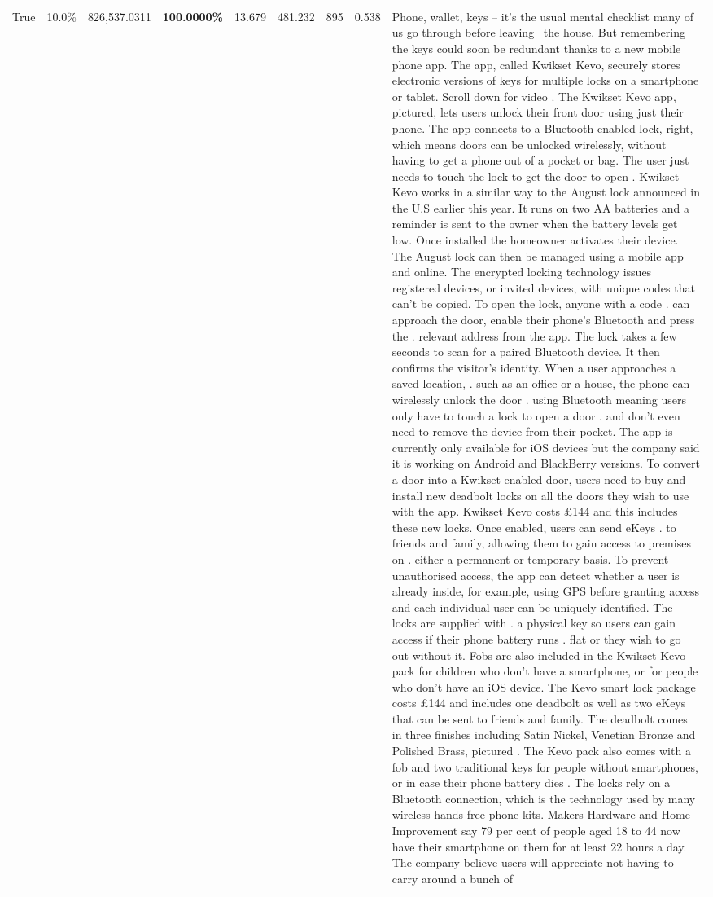 \begin{table}[H]
\begin{tabular}{lllrlllll}
True & 10.0\% & 826,537.0311 & \bfseries \color{red} 100.0000\% & 13.679 & 481.232 & 895 & 0.538 & Phone, wallet, keys – it’s the usual mental checklist many of us go through before leaving  the house. But remembering the keys could soon be redundant thanks to a new mobile phone app. The app, called Kwikset Kevo, securely stores electronic versions of keys for multiple locks on a smartphone or tablet. Scroll down for video . The Kwikset Kevo app, pictured, lets users unlock their front door using just their phone. The app connects to a Bluetooth enabled lock, right, which means doors can be unlocked wirelessly, without having to get a phone out of a pocket or bag. The user just needs to touch the lock to get the door to open . Kwikset Kevo works in a similar way to the August lock announced in the U.S earlier this year. It runs on two AA batteries and a reminder is sent to the owner when the battery levels get low. Once installed the homeowner activates their device. The August lock can then be managed using a mobile app and online. The encrypted locking technology issues registered devices, or invited devices, with unique codes that can't be copied. To open the lock, anyone with a code . can approach the door, enable their phone's Bluetooth and press the . relevant address from the app. The lock takes a few seconds to scan for a paired Bluetooth device. It then confirms the visitor's identity. When a user approaches a saved location, . such as an office or a house, the phone can wirelessly unlock the door . using Bluetooth meaning users only have to touch a lock to open a door . and don't even need to remove the device from their pocket. The app is currently only available for iOS devices but the company said it is working on Android and BlackBerry versions. To convert a door into a Kwikset-enabled door, users need to buy and install new deadbolt locks on all the doors they wish to use with the app. Kwikset Kevo costs £144 and this includes these new locks. Once enabled, users can send eKeys . to friends and family, allowing them to gain access to premises on . either a permanent or temporary basis. To prevent unauthorised access, the app can detect whether a user is already inside, for example, using GPS before granting access and each individual user can be uniquely identified. The locks are supplied with . a physical key so users can gain access if their phone battery runs . flat or they wish to go out without it. Fobs are also included in the Kwikset Kevo pack for children who don't have a smartphone, or for people who don't have an iOS device. The Kevo smart lock package costs £144 and includes one deadbolt as well as two eKeys that can be sent to friends and family. The deadbolt comes in three finishes including Satin Nickel, Venetian Bronze and Polished Brass, pictured . The Kevo pack also comes with a fob and two traditional keys for people without smartphones, or in case their phone battery dies . The locks rely on a Bluetooth connection, which is the technology used by many wireless hands-free phone kits. Makers Hardware and Home Improvement say 79 per cent of people aged 18 to 44 now have their smartphone on them for at least 22 hours a day. The company believe users will appreciate not having to carry around a bunch of 
\end{tabular}
\end{table}
